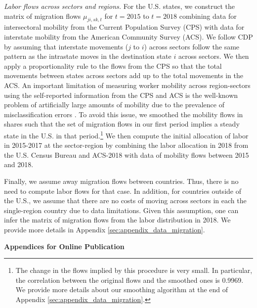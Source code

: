 \documentclass[12pt]{article}
\begin{document}
{\textit{Labor flows across sectors and regions.}} For the U.S. states, we construct the matrix of migration flows $\mu_{ji,sk,t}$ for $t = 2015$ to $t=2018$ combining data for intersectoral mobility from the Current Population Survey (CPS) with data for interstate mobility from the American Community Survey (ACS). We follow CDP by assuming that interstate movements ($j$ to $i$) across sectors follow the same pattern as the intrastate moves in the destination state $i$ across sectors. We then apply a proportionality rule to the flows from the CPS so that the total movements between states across sectors add up to the total movements in the ACS. An important limitation of measuring worker mobility across region-sectors using the self-reported information from the CPS and ACS is the well-known problem of artificially large amounts of mobility due to the prevalence of misclassification errors \citep{murphy1987unemployment,kambourov2008rising,kambourov2013cautionary,Dvorkin2021}. To avoid this issue, we smoothed the mobility flows in shares such that the set of migration flows in our first period implies a steady state in the U.S. in that period.\footnote{The change in the flows implied by this procedure is very small. In particular, the correlation between the original flows and the smoothed ones is 0.9969. We provide more details about our smoothing algorithm at the end of Appendix \ref{sec:appendix_data_migration}.} We then compute the initial allocation of labor in 2015-2017 at the sector-region by combining the labor allocation in 2018 from the U.S. Census Bureau and ACS-2018 with data of mobility flows between 2015 and 2018. 

Finally, we assume away migration flows between countries. Thus, there is no need to compute labor flows for that case. In addition, for countries outside of the U.S., we assume that there are no costs of moving across sectors in each the single-region country due to data limitations. Given this assumption, one can infer the matrix of migration flows from the labor distribution in 2018. We provide more details in Appendix \ref{sec:appendix_data_migration}.

\clearpage
\setcounter{page}{1}
\renewcommand{\theequation}{\Alph{section}\arabic{equation}}
\setcounter{equation}{0}
\noindent
{\LARGE \textbf{Appendices for Online Publication}}
\setlength{\belowdisplayskip}{3pt}
\setlength{\belowdisplayshortskip}{3pt}
\setlength{\abovedisplayskip}{3pt}
\setlength{\abovedisplayshortskip}{3pt}
\end{document}
